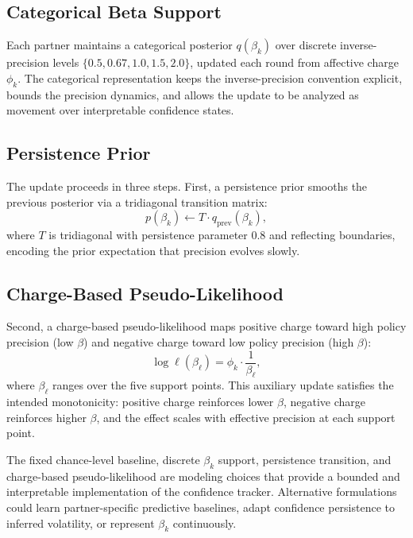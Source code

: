 \documentclass[runningheads,orivec]{llncs}
\begin{document}
\subsection{Categorical Beta Support}

Each partner maintains a categorical posterior $q(\beta_k)$ over discrete inverse-precision levels $\{0.5, 0.67, 1.0, 1.5, 2.0\}$, updated each round from affective charge $\phi_k$. The categorical representation keeps the inverse-precision convention explicit, bounds the precision dynamics, and allows the update to be analyzed as movement over interpretable confidence states.

\subsection{Persistence Prior}

The update proceeds in three steps. First, a persistence prior smooths the previous posterior via a tridiagonal transition matrix:
\begin{equation}
p(\beta_k) \leftarrow T \cdot q_{\text{prev}}(\beta_k),
\label{eq:persistence}
\end{equation}
where $T$ is tridiagonal with persistence parameter 0.8 and reflecting boundaries, encoding the prior expectation that precision evolves slowly.

\subsection{Charge-Based Pseudo-Likelihood}

Second, a charge-based pseudo-likelihood maps positive charge toward high policy precision (low $\beta$) and negative charge toward low policy precision (high $\beta$):
\begin{equation}
\log \ell(\beta_\ell) = \phi_k \cdot \frac{1}{\beta_\ell},
\label{eq:pseudo_lik}
\end{equation}
where $\beta_\ell$ ranges over the five support points. This auxiliary update satisfies the intended monotonicity: positive charge reinforces lower $\beta$, negative charge reinforces higher $\beta$, and the effect scales with effective precision at each support point.

The fixed chance-level baseline, discrete $\beta_k$ support, persistence transition, and charge-based pseudo-likelihood are modeling choices that provide a bounded and interpretable implementation of the confidence tracker. Alternative formulations could learn partner-specific predictive baselines, adapt confidence persistence to inferred volatility, or represent $\beta_k$ continuously.
\end{document}

